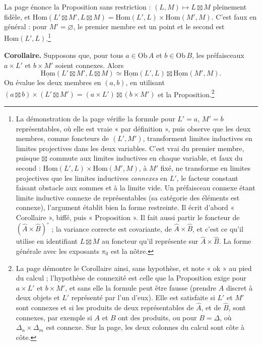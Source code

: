 \documentclass[11pt,a4paper]{article}
\begin{document}
La page énonce la Proposition sans restriction : $(L, M) \mapsto L \boxtimes
M$ pleinement fidèle, et $\mathrm{Hom}(L' \boxtimes M', L \boxtimes M) =
\mathrm{Hom}(L', L) \times \mathrm{Hom}(M', M)$. C'est faux en général : pour
$M' = \varnothing$, le premier membre est un point et le second est
$\mathrm{Hom}(L', L)$.\footnote{La démonstration de la page vérifie la formule
pour $L' = a$, $M' = b$ représentables, où elle est vraie « par définition »,
puis observe que les deux membres, comme foncteurs de $(L', M')$,
transforment limites inductives en limites projectives dans les deux
variables. C'est vrai du premier membre, puisque $\boxtimes$ commute aux
limites inductives en chaque variable, et faux du second : $\mathrm{Hom}(L',
L) \times \mathrm{Hom}(M', M)$, à $M'$ fixé, ne transforme en limites
projectives que les limites inductives \emph{connexes} en $L'$, le facteur
constant faisant obstacle aux sommes et à la limite vide. Un préfaisceau
connexe étant limite inductive connexe de représentables (sa catégorie des
éléments est connexe), l'argument établit bien la forme restreinte. Il
écrit d'abord « Corollaire », biffé, puis « Proposition ». Il fait aussi
partir le foncteur de $(\widehat{A} \times \widehat{B})^{\circ}$ ; la variance
correcte est covariante, de $\widehat{A} \times \widehat{B}$, et c'est ce
qu'il utilise en identifiant $L \boxtimes M$ au foncteur qu'il représente
sur $\widehat{A} \times \widehat{B}$. La forme générale avec les exposants
$\pi_{0}$ est la nôtre.}

\textbf{Corollaire.} Supposons que, pour tous $a \in \mathrm{Ob}\, A$ et $b
\in \mathrm{Ob}\, B$, les préfaisceaux $a \times L'$ et $b \times M'$ soient
connexes. Alors
\[
\underline{\mathrm{Hom}}(L' \boxtimes M', L \boxtimes M) \simeq
\underline{\mathrm{Hom}}(L', L) \boxtimes \underline{\mathrm{Hom}}(M', M).
\]
On évalue les deux membres en $(a, b)$, en utilisant $(a \boxtimes b) \times
(L' \boxtimes M') = (a \times L') \boxtimes (b \times M')$ et la
Proposition.\footnote{La page démontre le Corollaire ainsi, sans hypothèse,
et note « ok » au pied du calcul ; l'hypothèse de connexité est celle que la
Proposition exige pour $a \times L'$ et $b \times M'$, et sans elle la formule
peut être fausse (prendre $A$ discret à deux objets et $L'$ représenté par l'un
d'eux). Elle est satisfaite si $L'$ et $M'$ sont connexes et si les produits de
deux représentables de $\widehat{A}$, et de $\widehat{B}$, sont connexes,
par exemple si $A$ et $B$ ont des produits, ou pour $B = \Delta$, où
$\Delta_{n} \times \Delta_{m}$ est connexe. Sur la page, les deux colonnes du
calcul sont côte à côte.}
\end{document}
